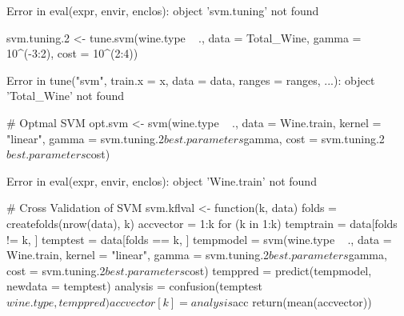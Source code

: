 \documentclass[letterpaper]{article}\usepackage[]{graphicx}\usepackage[]{color}
\begin{document}
\begin{Schunk}
\begin{Soutput}
\end{Soutput}
\begin{Soutput}
Error in eval(expr, envir, enclos): object 'svm.tuning' not found
\end{Soutput}
\begin{Sinput}
svm.tuning.2 <- tune.svm(wine.type ~ ., data = Total_Wine, gamma = 10^(-3:2), 
    cost = 10^(2:4))
\end{Sinput}
\begin{Soutput}
Error in tune("svm", train.x = x, data = data, ranges = ranges, ...): object 'Total_Wine' not found
\end{Soutput}
\begin{Sinput}
# Optmal SVM
opt.svm <- svm(wine.type ~ ., data = Wine.train, kernel = "linear", gamma = svm.tuning.2$best.parameters$gamma, 
    cost = svm.tuning.2$best.parameters$cost)
\end{Sinput}
\begin{Soutput}
Error in eval(expr, envir, enclos): object 'Wine.train' not found
\end{Soutput}
\begin{Sinput}
# Cross Validation of SVM
svm.kflval <- function(k, data) {
    folds = createfolds(nrow(data), k)
    accvector = 1:k
    for (k in 1:k) {
        temptrain = data[folds != k, ]
        temptest = data[folds == k, ]
        tempmodel = svm(wine.type ~ ., data = Wine.train, kernel = "linear", 
            gamma = svm.tuning.2$best.parameters$gamma, cost = svm.tuning.2$best.parameters$cost)
        temppred = predict(tempmodel, newdata = temptest)
        analysis = confusion(temptest$wine.type, temppred)
        accvector[k] = analysis$acc
    }
    return(mean(accvector))
}


\end{Sinput}
\end{Schunk}
\end{document}
